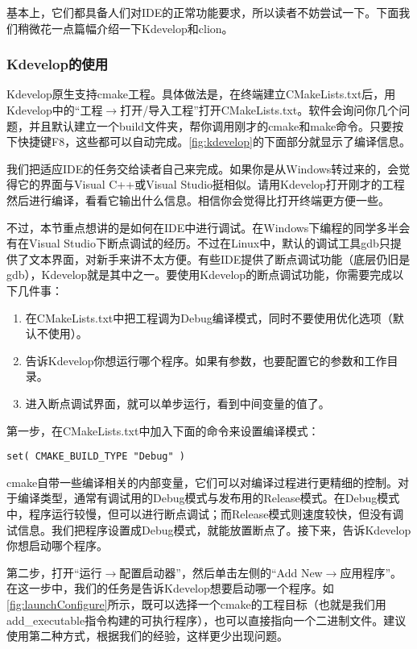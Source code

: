 基本上，它们都具备人们对IDE的正常功能要求，所以读者不妨尝试一下。下面我们稍微花一点篇幅介绍一下Kdevelop和clion。

\subsubsection{Kdevelop的使用}

Kdevelop原生支持cmake工程。具体做法是，在终端建立CMakeLists.txt后，用Kdevelop中的“工程$\rightarrow$打开/导入工程”打开CMakeLists.txt。软件会询问你几个问题，并且默认建立一个build文件夹，帮你调用刚才的cmake和make命令。只要按下快捷键F8，这些都可以自动完成。\autoref{fig:kdevelop}的下面部分就显示了编译信息。

我们把适应IDE的任务交给读者自己来完成。如果你是从Windows转过来的，会觉得它的界面与Visual C++或Visual Studio挺相似。请用Kdevelop打开刚才的工程然后进行编译，看看它输出什么信息。相信你会觉得比打开终端更方便一些。

不过，本节重点想讲的是如何在IDE中进行调试。在Windows下编程的同学多半会有在Visual Studio下断点调试的经历。不过在Linux中，默认的调试工具gdb只提供了文本界面，对新手来讲不太方便。有些IDE提供了断点调试功能（底层仍旧是gdb），Kdevelop就是其中之一。要使用Kdevelop的断点调试功能，你需要完成以下几件事：

\begin{enumerate}
	\item 在CMakeLists.txt中把工程调为Debug编译模式，同时不要使用优化选项（默认不使用）。
	\item 告诉Kdevelop你想运行哪个程序。如果有参数，也要配置它的参数和工作目录。
	\item 进入断点调试界面，就可以单步运行，看到中间变量的值了。
\end{enumerate}


第一步，在CMakeLists.txt中加入下面的命令来设置编译模式：
\begin{lstlisting}[caption=slambook2/ch2/CMakeLists.txt]
set( CMAKE_BUILD_TYPE "Debug" )
\end{lstlisting}

cmake自带一些编译相关的内部变量，它们可以对编译过程进行更精细的控制。对于编译类型，通常有调试用的Debug模式与发布用的Release模式。在Debug模式中，程序运行较慢，但可以进行断点调试；而Release模式则速度较快，但没有调试信息。我们把程序设置成Debug模式，就能放置断点了。接下来，告诉Kdevelop你想启动哪个程序。

第二步，打开“运行$\rightarrow$配置启动器”，然后单击左侧的“Add New$\rightarrow$应用程序”。在这一步中，我们的任务是告诉Kdevelop想要启动哪一个程序。如\autoref{fig:launchConfigure}所示，既可以选择一个cmake的工程目标（也就是我们用add_executable指令构建的可执行程序），也可以直接指向一个二进制文件。建议使用第二种方式，根据我们的经验，这样更少出现问题。

